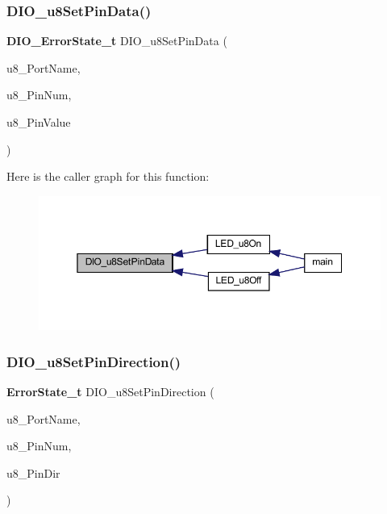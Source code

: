 \subsubsection{D\+I\+O\+\_\+u8\+Set\+Pin\+Data()}
{\footnotesize\ttfamily \textbf{ D\+I\+O\+\_\+\+Error\+State\+\_\+t} D\+I\+O\+\_\+u8\+Set\+Pin\+Data (\begin{DoxyParamCaption}\item[{\textbf{ D\+I\+O\+Port\+\_\+t}}]{u8\+\_\+\+Port\+Name,  }\item[{\textbf{ D\+I\+O\+Pin\+\_\+t}}]{u8\+\_\+\+Pin\+Num,  }\item[{\textbf{ uint8\+\_\+t}}]{u8\+\_\+\+Pin\+Value }\end{DoxyParamCaption})}

Here is the caller graph for this function\+:
\nopagebreak
\begin{figure}[H]
\begin{center}
\leavevmode
\includegraphics[width=350pt]{_d_i_o_8c_a5d5a58f8379f5708eb64eae7d5b059ca_icgraph}
\end{center}
\end{figure}
\mbox{\label{_d_i_o_8c_ad16a829fb6b44a4a9a3ab4d57401a4fc}} 
\subsubsection{D\+I\+O\+\_\+u8\+Set\+Pin\+Direction()}
{\footnotesize\ttfamily \textbf{ Error\+State\+\_\+t} D\+I\+O\+\_\+u8\+Set\+Pin\+Direction (\begin{DoxyParamCaption}\item[{\textbf{ D\+I\+O\+Port\+\_\+t}}]{u8\+\_\+\+Port\+Name,  }\item[{\textbf{ D\+I\+O\+Pin\+\_\+t}}]{u8\+\_\+\+Pin\+Num,  }\item[{\textbf{ D\+I\+O\+Dir\+\_\+t}}]{u8\+\_\+\+Pin\+Dir }\end{DoxyParamCaption})}



